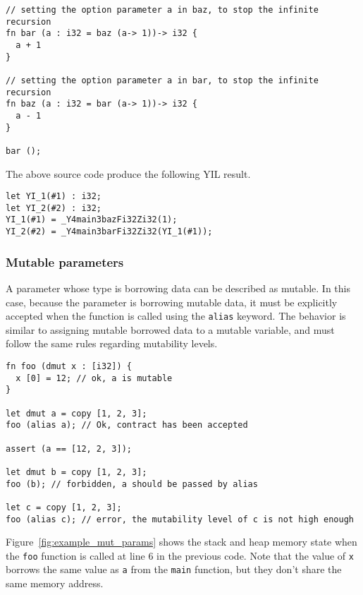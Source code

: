 \begin{lstlisting}[style=coloredverbatim]
// setting the option parameter a in baz, to stop the infinite recursion
fn bar (a : i32 = baz (a-> 1))-> i32 {
  a + 1
}

// setting the option parameter a in bar, to stop the infinite recursion
fn baz (a : i32 = bar (a-> 1))-> i32 {
  a - 1
}

bar ();
\end{lstlisting}

The above source code produce the following YIL result.

\begin{lstlisting}[style=intermediateVerb]
let YI_1(#1) : i32;
let YI_2(#2) : i32;
YI_1(#1) = _Y4main3bazFi32Zi32(1);
YI_2(#2) = _Y4main3barFi32Zi32(YI_1(#1));
\end{lstlisting}


\subsubsection {Mutable parameters}
\label{sec:mutable_parameter}

A parameter whose type is borrowing data can be described as mutable. In this
case, because the parameter is borrowing mutable data, it must be explicitly
accepted when the function is called using the \texttt{alias} keyword. The
behavior is similar to assigning mutable borrowed data to a mutable variable,
and must follow the same rules regarding mutability levels.

\begin{lstlisting}[style=coloredverbatim]
fn foo (dmut x : [i32]) {
  x [0] = 12; // ok, a is mutable
}

let dmut a = copy [1, 2, 3];
foo (alias a); // Ok, contract has been accepted

assert (a == [12, 2, 3]);

let dmut b = copy [1, 2, 3];
foo (b); // forbidden, a should be passed by alias

let c = copy [1, 2, 3];
foo (alias c); // error, the mutability level of c is not high enough
\end{lstlisting}

Figure~\ref{fig:example_mut_params} shows the stack and heap memory state when
the \texttt{foo} function is called at line 6 in the previous code. Note that
the value of \texttt{x} borrows the same value as \texttt{a} from the
\texttt{main} function, but they don't share the same memory address.

